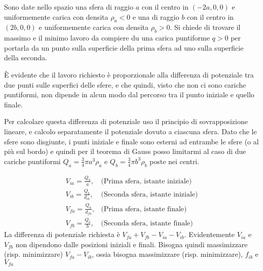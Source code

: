 \documentclass[../main.tex]{subfiles}
\begin{document}

\textex
Sono date nello spazio una sfera di raggio $a$ con il centro in $(-2a,0,0)$ e uniformemente carica con densita $\rho_a<0$ e una di raggio $b$ con il centro in $(2b,0,0)$ e uniformemente carica con densita $\rho_b>0$. Si chiede di trovare il massimo e il minimo lavoro da compiere du una carica puntiforme $q>0$ per portarla da un punto sulla superficie della prima sfera ad uno sulla superficie della seconda.

\solution
\`E evidente che il lavoro richiesto \`e proporzionale alla differenza di potenziale tra due punti sulle superfici delle sfere, e che quindi, visto che non ci sono cariche puntiformi, non dipende in alcun modo dal percorso tra il punto iniziale e quello finale.

Per calcolare questa differenza di potenziale uso il principio di sovrapposizione lineare, e calcolo separatamente il potenziale dovuto a ciascuna sfera. Dato che le sfere sono disgiunte, i punti iniziale e finale sono esterni ad entrambe le sfere (o al pi\`u sul bordo) e quindi per il teorema di Gauss posso limitarmi al caso di due cariche puntiformi $Q_a=\frac{3}{4} \pi a^3 \rho_a $ e $Q_b=\frac{3}{4} \pi b^3 \rho_b $  poste nei centri.

\begin{subequations}
  \label{dsc:potenziali}
  \begin{align}
    V_{ia}=\frac{Q_a}{a},	& \text{(Prima sfera, istante iniziale)} \\
    V_{ib}=\frac{Q_b}{d_{ib}},	& \text{(Seconda sfera, istante iniziale)} \\
    V_{fa}=\frac{Q_a}{d_{fa}},	& \text{(Prima sfera, istante finale)} \\
    V_{fb}=\frac{Q_b}{b},	& \text{(Seconda sfera, istante finale)}
  \end{align}
\end{subequations}
La differenza di potenziale richiesta \`e $V_{fa}+V_{fb}-V_{ia}-V_{ib}$.
Evidentemente $V_{ia}$ e $V_{fb}$ non dipendono dalle posizioni iniziali e finali. Bisogna quindi massimizzare (risp. minimizzare) $V_{fa}-V_{ib}$, ossia bisogna massimizzare (risp. minimizzare), $f_{ib}$ e $V_{fa}$
\end{document}
